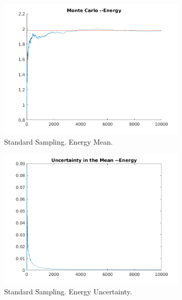 \documentclass{article}
\begin{document}
\begin{enumerate}
\begin{enumerate}
        \begin{figure}
          \centering
          \includegraphics[width=0.8\textwidth]{standard_energy_mean}
          \caption{Standard Sampling. Energy Mean.}
          \label{fig:partition_scheme}
        \end{figure}

        \begin{figure}
          \centering
          \includegraphics[width=0.8\textwidth]{standard_energy_uncertainty}
          \caption{Standard Sampling. Energy Uncertainty.}
          \label{fig:standard_energy_uncertainty}
        \end{figure}


\end{enumerate}
\end{enumerate}
\end{document}
